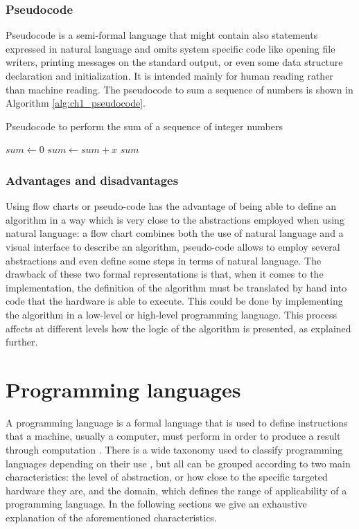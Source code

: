 \subsubsection*{Pseudocode}
Pseudocode is a semi-formal language that might contain also statements expressed in natural language and omits system specific code like opening file writers, printing messages on the standard output, or even some data structure declaration and initialization. It is intended mainly for human reading rather than machine reading. The pseudocode to sum a sequence of numbers is shown in Algorithm \ref{alg:ch1_pseudocode}.

\begin{algorithm}
	\caption{Pseudocode to perform the sum of a sequence of integer numbers}
	\label{alg:ch1_pseudocode}
	\begin{algorithmic}
			\State $sum \gets 0$
				\State $sum \gets sum + x$
			\EndFor
			\State \Return $sum$
		\EndFunction
	\end{algorithmic}
\end{algorithm}

\subsubsection*{Advantages and disadvantages}
Using flow charts or pseudo-code has the advantage of being able to define an algorithm in a way which is very close to the abstractions employed when using natural language: a flow chart combines both the use of natural language and a visual interface to describe an algorithm, pseudo-code allows to employ several abstractions and even define some steps in terms of natural language. The drawback of these two formal representations is that, when it comes to the implementation, the definition of the algorithm must be translated by hand into code that the hardware is able to execute. This could be done by implementing the algorithm in a low-level or high-level programming language. This process affects at different levels how the logic of the algorithm is presented, as explained further.

\section{Programming languages}
\label{sec:ch1_programming_languages}
A programming language is a formal language that is used to define instructions that a machine, usually a computer, must perform in order to produce a result through computation \cite{mordechai1996, narasimhan1967programming, oxford2008}. There is a wide taxonomy used to classify programming languages depending on their use \cite{kelleher2005lowering, myers1986visual, myers1990taxonomies}, but all can be grouped according to two main characteristics: the level of abstraction, or how close to the specific targeted hardware they are, and the domain, which defines the range of applicability of a programming language. In the following sections we give an exhaustive explanation of the aforementioned characteristics.

